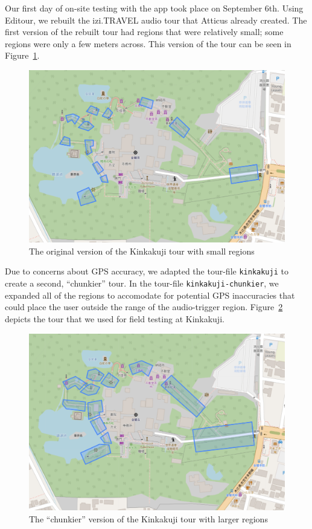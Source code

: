 \documentclass[a4paper, 10pt, american, titlepage]{article}
\begin{document}
Our first day of on-site testing with the app took place on September 6th.
Using Editour, we rebuilt the izi.TRAVEL audio tour that Atticus already
created. The first version of the rebuilt tour had regions that were relatively
small; some regions were only a few meters across. This version of the tour can
be seen in Figure~\ref{fig:kinkakujiTour}.

\begin{figure}[h]
	\centering
	\includegraphics[width=\textwidth]{kinkakuji-tour.png}
	\caption[The original version of the Kinkakuji tour]{The original version of
    the Kinkakuji tour with small regions}
	\label{fig:kinkakujiTour}
\end{figure}

Due to concerns about GPS accuracy, we adapted the tour-file \texttt{kinkakuji} to
create a second, ``chunkier'' tour.  In the tour-file \texttt{kinkakuji-chunkier},
we expanded all of the regions to accomodate for potential GPS inaccuracies
that could place the user outside the range of the audio-trigger region.
Figure~\ref{fig:kinkakujiChunkierTour} depicts the tour that we used for field
testing at Kinkakuji.

\begin{figure}[h]
	\centering
	\includegraphics[width=\textwidth]{kinkakuji-chunkier-tour.png}
	\caption[The ``chunkier'' version of the Kinkakuji tour]{The ``chunkier'' version of
    the Kinkakuji tour with larger regions}
	\label{fig:kinkakujiChunkierTour}
\end{figure}
\end{document}

